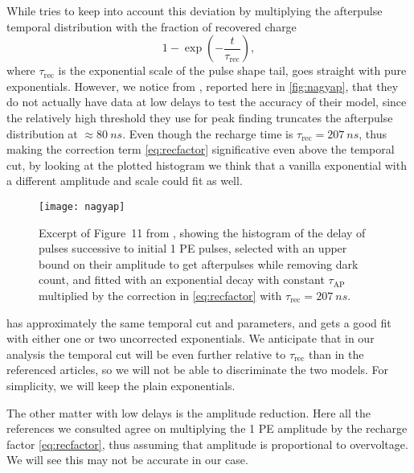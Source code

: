 While \cite[2]{nagy2014} tries to keep into account this deviation by
multiplying the afterpulse temporal distribution with the fraction of recovered
charge
%
\begin{equation}
    1 - \exp\left(-\frac{t}{\tau_\text{rec}}\right),
    \label{eq:recfactor}
\end{equation}
%
where $\tau_\text{rec}$ is the exponential scale of the pulse shape tail,
\cite[4]{garutti2014} goes straight with pure exponentials. However, we notice
from \cite[p.~5~fig.~11]{nagy2014}, reported here in \autoref{fig:nagyap}, that
they do not actually have data at low delays to test the accuracy of their
model, since the relatively high threshold they use for peak finding truncates
the afterpulse distribution at $\approx\SI{80}{ns}$. Even though the recharge
time is $\tau_\text{rec} = \SI{207}{ns}$, thus making the correction term
\eqref{eq:recfactor} significative even above the temporal cut, by looking at
the plotted histogram we think that a vanilla exponential with a different
amplitude and scale could fit as well.

\begin{figure}
    
    \centering
    \texttt{[image: nagyap]}
    
    \caption{\label{fig:nagyap} Excerpt of Figure~11 from \cite{nagy2014},
    showing the histogram of the delay of pulses successive to initial 1 PE
    pulses, selected with an upper bound on their amplitude to get afterpulses
    while removing dark count, and fitted with an exponential decay with
    constant $\tau_\text{AP}$ multiplied by the correction in
    \autoref{eq:recfactor} with $\tau_\text{rec} = \SI{207}{ns}$.}
    
\end{figure}

\cite{garutti2014} has approximately the same temporal cut and parameters, and
gets a good fit with either one or two uncorrected exponentials. We anticipate
that in our analysis the temporal cut will be even further relative to
$\tau_\text{rec}$ than in the referenced articles, so we will not be able to
discriminate the two models. For simplicity, we will keep the plain
exponentials.

The other matter with low delays is the amplitude reduction. Here all the
references we consulted agree on multiplying the 1 PE amplitude by the recharge
factor \eqref{eq:recfactor}, thus assuming that amplitude is proportional to
overvoltage. We will see this may not be accurate in our case.

